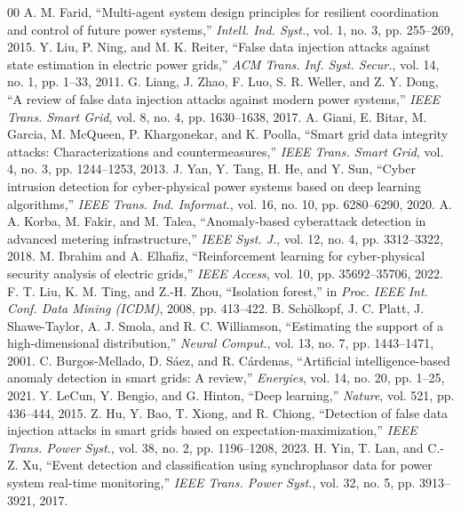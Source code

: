 \documentclass[conference,a4paper]{IEEEtran}
\begin{document}
\begin{thebibliography}{00}
 A. M. Farid, ``Multi-agent system design principles for resilient coordination and control of future power systems,'' \textit{Intell. Ind. Syst.}, vol. 1, no. 3, pp. 255--269, 2015.
 Y. Liu, P. Ning, and M. K. Reiter, ``False data injection attacks against state estimation in electric power grids,'' \textit{ACM Trans. Inf. Syst. Secur.}, vol. 14, no. 1, pp. 1--33, 2011.
 G. Liang, J. Zhao, F. Luo, S. R. Weller, and Z. Y. Dong, ``A review of false data injection attacks against modern power systems,'' \textit{IEEE Trans. Smart Grid}, vol. 8, no. 4, pp. 1630--1638, 2017.
 A. Giani, E. Bitar, M. Garcia, M. McQueen, P. Khargonekar, and K. Poolla, ``Smart grid data integrity attacks: Characterizations and countermeasures,'' \textit{IEEE Trans. Smart Grid}, vol. 4, no. 3, pp. 1244--1253, 2013.
 J. Yan, Y. Tang, H. He, and Y. Sun, ``Cyber intrusion detection for cyber-physical power systems based on deep learning algorithms,'' \textit{IEEE Trans. Ind. Informat.}, vol. 16, no. 10, pp. 6280--6290, 2020.
 A. A. Korba, M. Fakir, and M. Talea, ``Anomaly-based cyberattack detection in advanced metering infrastructure,'' \textit{IEEE Syst. J.}, vol. 12, no. 4, pp. 3312--3322, 2018.
 M. Ibrahim and A. Elhafiz, ``Reinforcement learning for cyber-physical security analysis of electric grids,'' \textit{IEEE Access}, vol. 10, pp. 35692--35706, 2022.
 F. T. Liu, K. M. Ting, and Z.-H. Zhou, ``Isolation forest,'' in \textit{Proc. IEEE Int. Conf. Data Mining (ICDM)}, 2008, pp. 413--422.
 B. Sch{\"o}lkopf, J. C. Platt, J. Shawe-Taylor, A. J. Smola, and R. C. Williamson, ``Estimating the support of a high-dimensional distribution,'' \textit{Neural Comput.}, vol. 13, no. 7, pp. 1443--1471, 2001.
 C. Burgos-Mellado, D. S{\'a}ez, and R. C{\'a}rdenas, ``Artificial intelligence-based anomaly detection in smart grids: A review,'' \textit{Energies}, vol. 14, no. 20, pp. 1--25, 2021.
 Y. LeCun, Y. Bengio, and G. Hinton, ``Deep learning,'' \textit{Nature}, vol. 521, pp. 436--444, 2015.
 Z. Hu, Y. Bao, T. Xiong, and R. Chiong, ``Detection of false data injection attacks in smart grids based on expectation-maximization,'' \textit{IEEE Trans. Power Syst.}, vol. 38, no. 2, pp. 1196--1208, 2023.
 H. Yin, T. Lan, and C.-Z. Xu, ``Event detection and classification using synchrophasor data for power system real-time monitoring,'' \textit{IEEE Trans. Power Syst.}, vol. 32, no. 5, pp. 3913--3921, 2017.

\end{thebibliography}
\end{document}
